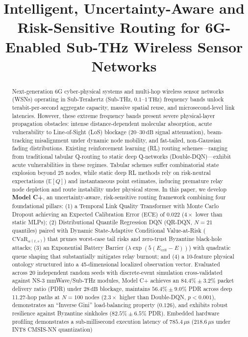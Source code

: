 \documentclass[conference]{IEEEtran}
\begin{document}
\title{Intelligent, Uncertainty-Aware and Risk-Sensitive Routing for 6G-Enabled Sub-THz Wireless Sensor Networks}

\author{
}

\maketitle

\begin{abstract}
Next-generation 6G cyber-physical systems and multi-hop wireless sensor networks (WSNs) operating in Sub-Terahertz (Sub-THz, $0.1\text{--}1\,\text{THz}$) frequency bands unlock terabit-per-second aggregate capacity, massive spatial reuse, and microsecond-level link latencies. However, these extreme frequency bands present severe physical-layer propagation obstacles: intense distance-dependent molecular absorption, acute vulnerability to Line-of-Sight (LoS) blockage ($20\text{--}30\,\text{dB}$ signal attenuation), beam-tracking misalignment under dynamic node mobility, and fat-tailed, non-Gaussian fading distributions. Existing reinforcement learning (RL) routing schemes---ranging from traditional tabular Q-routing to static deep Q-networks (Double-DQN)---exhibit acute vulnerabilities in these regimes. Tabular schemes suffer combinatorial state explosion beyond 25 nodes, while static deep RL methods rely on risk-neutral expectations ($\mathbb{E}[Q]$) and instantaneous point estimates, inducing premature relay node depletion and route instability under physical stress. In this paper, we develop \textbf{Model C+}, an uncertainty-aware, risk-sensitive routing framework combining four foundational pillars: (1) a Temporal Link Quality Transformer with Monte Carlo Dropout achieving an Expected Calibration Error (ECE) of $0.022$ ($4\times$ lower than static MLPs); (2) Distributional Quantile Regression DQN (QR-DQN, $N=21$ quantiles) paired with Dynamic State-Adaptive Conditional Value-at-Risk ($\text{CVaR}_{\alpha(t, s)}$) that prunes worst-case tail risks and zero-trust Byzantine black-hole attacks; (3) an Exponential Battery Barrier ($\lambda \exp(5(E_{\text{crit}} - E))$) with quadratic queue shaping that substantially mitigates relay burnout; and (4) a 10-feature physical ontology structured into a 45-dimensional localized observation vector. Evaluated across 20 independent random seeds with discrete-event simulation cross-validated against NS-3 mmWave/Sub-THz modules, Model C+ achieves an $84.4\% \pm 3.2\%$ packet delivery ratio (PDR) under $28\,\text{dB}$ blockage, maintains $56.4\% \pm 9.0\%$ PDR across deep 11.27-hop paths at $N=100$ nodes ($2.3\times$ higher than Double-DQN, $p < 0.001$), demonstrates an ``Inverse Gini'' load-balancing property ($0.126$), and exhibits robust resilience against Byzantine sinkholes ($82.5\% \pm 6.5\%$ PDR). Embedded hardware profiling demonstrates a sub-millisecond execution latency of $785.4\,\mu\text{s}$ ($218.6\,\mu\text{s}$ under INT8 CMSIS-NN quantization) 
\end{abstract}
\end{document}
